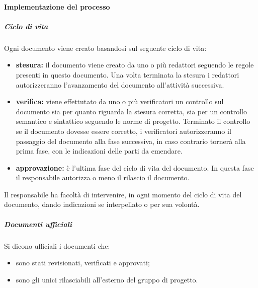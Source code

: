 			\paragraph{Implementazione del processo}
				\subparagraph{Ciclo di vita}
					Ogni documento viene creato basandosi sul seguente ciclo di vita:
					\begin{itemize}
					\item \textbf{stesura:} il documento viene creato da uno o più redattori seguendo le regole presenti in questo documento. Una volta terminata la stesura i redattori autorizzeranno l'avanzamento del documento all'attività successiva.
					\item \textbf{verifica:} viene effettutato da uno o più verificatori un controllo sul documento sia per quanto riguarda la stesura corretta, sia per un controllo semantico e sintattico seguendo le norme di progetto. Terminato il controllo se il documento dovesse essere corretto, i verificatori autorizzeranno il passaggio del documento alla fase successiva, in caso contrario tornerà alla prima fase, con le indicazioni delle parti da emendare.
					\item \textbf{approvazione:} è l'ultima fase del ciclo di vita del documento. In questa fase il responsabile autorizza o meno il rilascio il documento.
					\end{itemize}
				Il responsabile ha facoltà di intervenire, in ogni momento del ciclo di vita del documento, dando indicazioni se interpellato o per sua volontà.
				\subparagraph{Documenti ufficiali}
					Si dicono ufficiali i documenti che:
					\begin{itemize}
						\item sono stati revisionati, verificati e approvati;
						\item sono gli unici rilasciabili all'esterno del gruppo di progetto.
					\end{itemize}
					
